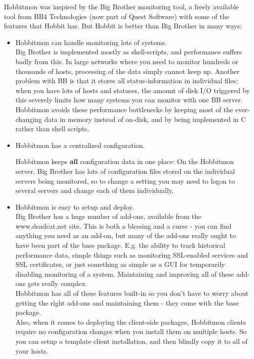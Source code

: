  Hobbitmon was inspired by the Big Brother monitoring tool, a freely available tool from BB4 Technologies (now part of Quest Software) with some of the features that Hobbit has. But Hobbit is better than Big Brother in many ways:
\begin{itemize}
\item Hobbitmon can handle monitoring lots of systems.\\ 


 Big Brother is implemented mostly as shell-scripts, and performance suffers badly from this. In large networks where you need to monitor hundreds or thousands of hosts, processing of the data simply cannot keep up. Another problem with BB is that it stores all status-information in individual files; when you have lots of hosts and statuses, the amount of disk I/O triggered by this severely limits how many systems you can monitor with one BB server.\\ 
 Hobbitmon avoids these performance bottlenecks by keeping most of the ever-changing data in memory instead of on-disk, and by being implemented in C rather than shell scripts.

\item Hobbitmon has a centralized configuration. 

 Hobbitmon keeps \textbf{all}
 configuration data in one place: On the Hobbitmon server. Big Brother has lots of configuration files stored on the individual servers being monitored, so to change a setting you may need to logon to several servers and change each of them individually.

\item Hobbitmon is easy to setup and deploy.\\ 


 Big Brother has a huge number of add-ons, available from the www.deadcat.net site. This is both a blessing and a curse - you can find anything you need as an add-on, but many of the add-ons really ought to have been part of the base package. E.g. the ability to track historical performance data, simple things such as monitoring SSL-enabled services and SSL certificates, or just something as simple as a GUI for temporarily disabling monitoring of a system. Maintaining and improving all of these add-ons gets really complex.\\ 
 Hobbitmon has all of these features built-in so you don't have to worry about getting the right add-ons and maintaining them - they come with the base package.\\ 
 Also, when it comes to deploying the client-side packages, Hobbitmon clients require no configuration changes when you install them on multiple hosts. So you can setup a template client installation, and then blindly copy it to all of your hosts.


\end{itemize}
